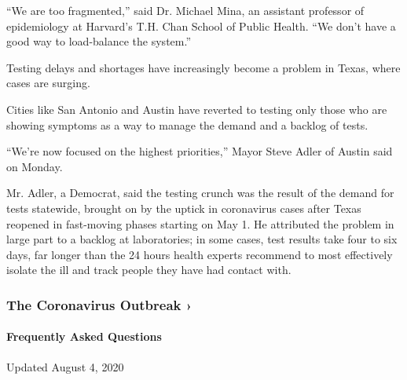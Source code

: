 ``We are too fragmented,'' said Dr. Michael Mina, an assistant professor
of epidemiology at Harvard's T.H. Chan School of Public Health. ``We
don't have a good way to load-balance the system.''

Testing delays and shortages have increasingly become a problem in
Texas, where cases are surging.

Cities like San Antonio and Austin have reverted to testing only those
who are showing symptoms as a way to manage the demand and a backlog of
tests.

``We're now focused on the highest priorities,'' Mayor Steve Adler of
Austin said on Monday.

Mr. Adler, a Democrat, said the testing crunch was the result of the
demand for tests statewide, brought on by the uptick in coronavirus
cases after Texas reopened in fast-moving phases starting on May 1. He
attributed the problem in large part to a backlog at laboratories; in
some cases, test results take four to six days, far longer than the 24
hours health experts recommend to most effectively isolate the ill and
track people they have had contact with.

\href{https://www.nytimes.com/news-event/coronavirus?action=click\&pgtype=Article\&state=default\&region=MAIN_CONTENT_3\&context=storylines_faq}{}

\hypertarget{the-coronavirus-outbreak-}{%
\subsubsection{The Coronavirus Outbreak
›}\label{the-coronavirus-outbreak-}}

\hypertarget{frequently-asked-questions}{%
\paragraph{Frequently Asked
Questions}\label{frequently-asked-questions}}

Updated August 4, 2020

